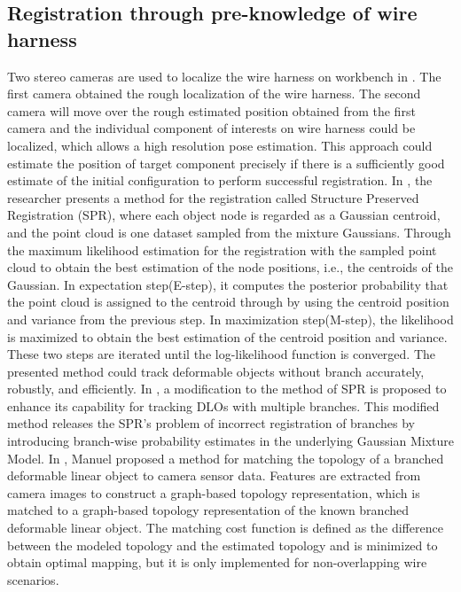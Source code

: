 \subsection{Registration through pre-knowledge of wire harness} \label{Registration through pre-knowledge of wire harness}
    Two stereo cameras are used to localize the wire harness 
    on workbench in \cite{10.1007/978-3-031-27933-1_31}. The first camera obtained the rough localization of the wire harness. The second camera will move over the rough estimated position 
    obtained from the first camera and the individual component of interests on wire harness could be localized, which allows a high resolution pose estimation. This approach could estimate 
    the position of target component precisely if there is a sufficiently good estimate of the initial configuration to perform successful registration.
    In \cite{doi:10.1177/0278364919841431}, the researcher presents a method for the registration called Structure Preserved Registration (SPR), where each object node is regarded as a Gaussian 
    centroid, and the point cloud is one dataset sampled from the mixture Gaussians. Through the maximum likelihood estimation for the registration with the sampled point cloud to obtain the 
    best estimation of the node positions, i.e., the centroids of the Gaussian. In expectation step(E-step), it computes the posterior probability that the point cloud is assigned to the
    centroid through by using the centroid position and variance from the previous step. In maximization step(M-step), the likelihood is maximized to obtain the best estimation of the centroid position 
    and variance. These two steps are iterated until the log-likelihood function is converged. The presented method could track deformable objects without branch accurately, robustly, and efficiently. 
    In \cite{9665147}, a modification to the method of SPR is proposed to enhance its capability for tracking DLOs with multiple branches. This modified method releases the SPR's problem of incorrect 
    registration of branches by introducing branch-wise probability estimates in the underlying Gaussian Mixture Model. In \cite{10161483}, Manuel proposed a method for matching the topology of a branched 
    deformable linear object to camera sensor data. Features are extracted from camera images to construct a graph-based topology representation, which is matched to a graph-based topology 
    representation of the known branched deformable linear object. The matching cost function is defined as the difference between the modeled topology 
    and the estimated topology and is minimized to obtain optimal mapping, but it is only implemented for non-overlapping wire scenarios.
